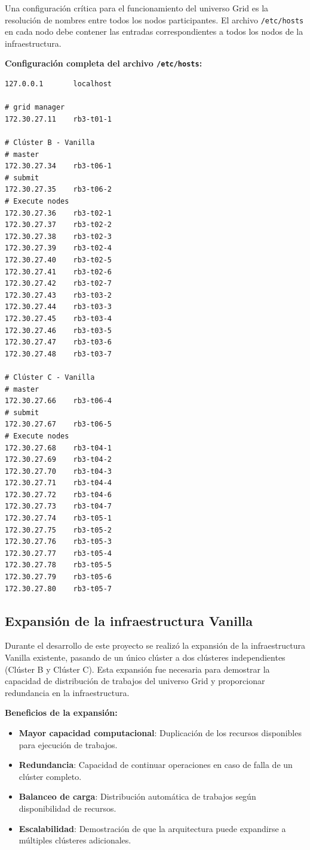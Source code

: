 Una configuración crítica para el funcionamiento del universo Grid es la resolución de nombres entre todos los nodos participantes. El archivo \texttt{/etc/hosts} en cada nodo debe contener las entradas correspondientes a todos los nodos de la infraestructura.

\textbf{Configuración completa del archivo \texttt{/etc/hosts}:}

\begin{verbatim}
127.0.0.1       localhost

# grid manager
172.30.27.11    rb3-t01-1

# Clúster B - Vanilla
# master
172.30.27.34    rb3-t06-1
# submit
172.30.27.35    rb3-t06-2
# Execute nodes
172.30.27.36    rb3-t02-1
172.30.27.37    rb3-t02-2
172.30.27.38    rb3-t02-3
172.30.27.39    rb3-t02-4
172.30.27.40    rb3-t02-5
172.30.27.41    rb3-t02-6
172.30.27.42    rb3-t02-7
172.30.27.43    rb3-t03-2
172.30.27.44    rb3-t03-3
172.30.27.45    rb3-t03-4
172.30.27.46    rb3-t03-5
172.30.27.47    rb3-t03-6
172.30.27.48    rb3-t03-7

# Clúster C - Vanilla
# master
172.30.27.66    rb3-t06-4
# submit
172.30.27.67    rb3-t06-5
# Execute nodes
172.30.27.68    rb3-t04-1
172.30.27.69    rb3-t04-2
172.30.27.70    rb3-t04-3
172.30.27.71    rb3-t04-4
172.30.27.72    rb3-t04-6
172.30.27.73    rb3-t04-7
172.30.27.74    rb3-t05-1
172.30.27.75    rb3-t05-2
172.30.27.76    rb3-t05-3
172.30.27.77    rb3-t05-4
172.30.27.78    rb3-t05-5
172.30.27.79    rb3-t05-6
172.30.27.80    rb3-t05-7
\end{verbatim}

\FloatBarrier\subsection{Expansión de la infraestructura Vanilla}

Durante el desarrollo de este proyecto se realizó la expansión de la infraestructura Vanilla existente, pasando de un único clúster a dos clústeres independientes (Clúster B y Clúster C). Esta expansión fue necesaria para demostrar la capacidad de distribución de trabajos del universo Grid y proporcionar redundancia en la infraestructura.

\textbf{Beneficios de la expansión:}

\begin{itemize}
	\item \textbf{Mayor capacidad computacional}: Duplicación de los recursos disponibles para ejecución de trabajos.
	
	\item \textbf{Redundancia}: Capacidad de continuar operaciones en caso de falla de un clúster completo.
	
	\item \textbf{Balanceo de carga}: Distribución automática de trabajos según disponibilidad de recursos.
	
	\item \textbf{Escalabilidad}: Demostración de que la arquitectura puede expandirse a múltiples clústeres adicionales.
\end{itemize}

